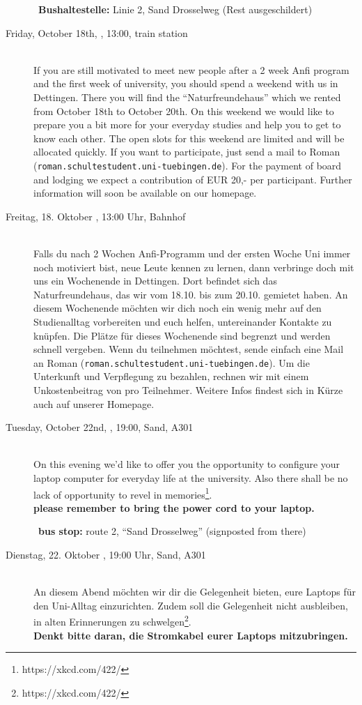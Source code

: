\begin{description}
~\textbf{Bushaltestelle:} Linie 2, Sand Drosselweg (Rest ausgeschildert)
\fi

\ifml
    \item[Friday, October 18th, \YEAR, 13:00, train station]\ \\
        If you are still motivated to meet new people after a 2 week Anfi program and the first week of university, you should spend a weekend with us in Dettingen. There you will find the "`Naturfreundehaus"' which we rented from October 18th to October 20th. On this weekend we would like to prepare you a bit more for your everyday studies and help you to get to know each other. The open slots for this weekend are limited and will be allocated quickly. If you want to participate, just send a mail to Roman (\texttt{roman.schulte\At student.uni-tuebingen.de}). For the payment of board and lodging we expect a contribution of EUR 20,- per participant. Further information will soon be available on our homepage.

\else
    \item[Freitag, 18. Oktober \YEAR, 13:00 Uhr, Bahnhof]\ \\
        Falls du nach 2 Wochen Anfi-Programm und der ersten Woche Uni immer noch motiviert bist, neue Leute kennen zu lernen, dann verbringe doch mit uns ein Wochenende in Dettingen. Dort befindet sich das Naturfreundehaus, das wir vom 18.10. bis zum 20.10. gemietet haben. An diesem Wochenende möchten wir dich noch ein wenig mehr auf den Studienalltag vorbereiten und euch helfen, untereinander Kontakte zu knüpfen. Die Plätze für dieses Wochenende sind begrenzt und werden schnell vergeben. Wenn du teilnehmen möchtest, sende einfach eine Mail an Roman (\texttt{roman.schulte\At student.uni-tuebingen.de}). Um die Unterkunft und Verpflegung zu bezahlen, rechnen wir mit einem Unkostenbeitrag von  pro Teilnehmer. Weitere Infos findest sich in Kürze auch auf unserer Homepage.
\fi

\ifml
    \item[Tuesday, October 22nd, \YEAR, 19:00, Sand, A301]\ \\
        On this evening we'd like to offer you the opportunity to configure your laptop computer for everyday life at the university. Also there shall be no lack of opportunity to revel in memories\footnote{https://xkcd.com/422/}.\\
        \textbf{please remember to bring the power cord to your laptop.}

	~\textbf{bus stop:} route 2, "`Sand Drosselweg"' (signposted from there)
\else
    \item[Dienstag, 22. Oktober \YEAR, 19:00 Uhr, Sand, A301]\ \\
        An diesem Abend möchten wir dir die Gelegenheit bieten, eure Laptops für den Uni-Alltag einzurichten. Zudem soll die Gelegenheit nicht ausbleiben, in alten Erinnerungen zu schwelgen\footnote{https://xkcd.com/422/}.\\
        \textbf{Denkt bitte daran, die Stromkabel eurer Laptops mitzubringen.}


\end{description}
